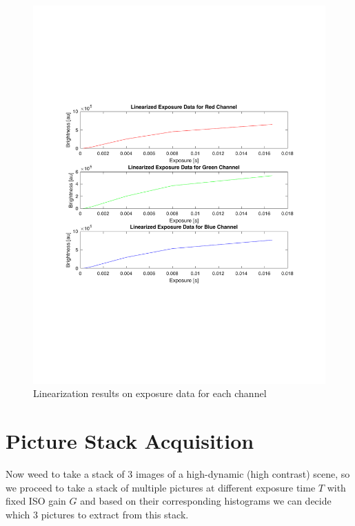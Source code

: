 \documentclass[a4paper]{article}
\begin{document}
\begin{figure}[htb!]
    \begin{center}
        \includegraphics[width=6 in]{linearExposure.pdf}
	 \end{center}
    \caption{Linearization results on exposure data for each channel} 
    \label{fig:linEx}
\end{figure}
\FloatBarrier
\section{Picture Stack Acquisition}
Now weed to take a stack of 3 images of a high-dynamic (high contrast) scene, so we proceed to take a stack of multiple pictures at different exposure time $T$ with fixed ISO gain $G$ and based on their corresponding histograms we can decide which 3 pictures to extract from this stack.
\end{document}
